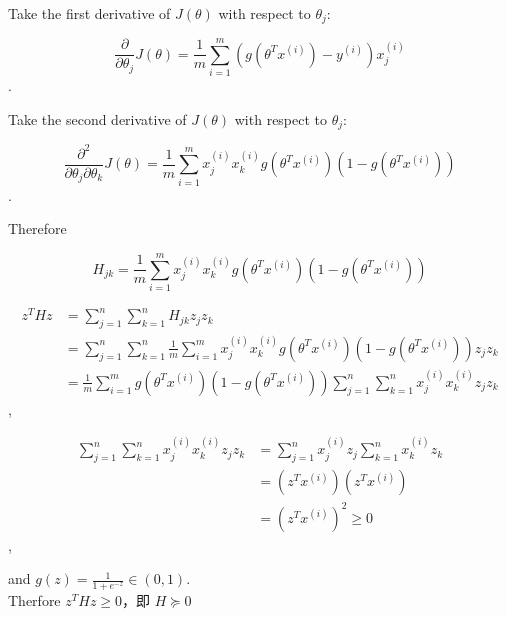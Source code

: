 \begin{answer}
	\\
    Take the first derivative of $J(\theta)$ with respect to $\theta_j$:
    
    $$
    \frac{\partial}{\partial \theta_j} J(\theta) = \frac{1}{m}\sum_{i = 1}^m (g(\theta^T x^{(i)}) - y^{(i)})x_j^{(i)}
    $$.
    
    Take the second derivative of $J(\theta)$ with respect to $\theta_j$:

    $$
    \frac{\partial^2}{\partial \theta_j \partial \theta_k} J(\theta) = \frac{1}{m}\sum_{i = 1}^m x_j^{(i)} x_k^{(i)} g(\theta^T x^{(i)}) (1 - g(\theta^T x^{(i)}))
    $$.
    
    Therefore
    
    $$
    H_{jk} = \frac{1}{m}\sum_{i = 1}^m x_j^{(i)} x_k^{(i)} g(\theta^T x^{(i)}) (1 - g(\theta^T x^{(i)}))
    $$
    
    \begin{align*}
    	z^T H z & = \sum_{j = 1}^n \sum_{k = 1}^n H_{jk} z_j z_k\\
    		& = \sum_{j = 1}^n \sum_{k = 1}^n \frac{1}{m}\sum_{i = 1}^m x_j^{(i)} x_k^{(i)} g(\theta^T x^{(i)}) (1 - g(\theta^T x^{(i)})) z_j z_k\\
    		& = \frac{1}{m}\sum_{i = 1}^m g(\theta^T x^{(i)}) (1 - g(\theta^T x^{(i)})) \sum_{j = 1}^n \sum_{k = 1}^n x_j^{(i)} x_k^{(i)} z_j z_k
    \end{align*},
    
    \begin{align*}
    	\sum_{j = 1}^n \sum_{k = 1}^n x_j^{(i)} x_k^{(i)} z_j z_k & = \sum_{j = 1}^n x_j^{(i)} z_j \sum_{k = 1}^n  x_k^{(i)} z_k\\
    		& = (z^T x^{(i)}) (z^T x^{(i)})\\
    		& = (z^T x^{(i)})^2 \ge 0
    \end{align*},
    
    and $g(z) = \frac{1}{1 + e^{-z}} \in (0, 1)$.\\
    Therfore $z^T H z \ge 0$，即 $H\succeq 0$
\end{answer}
